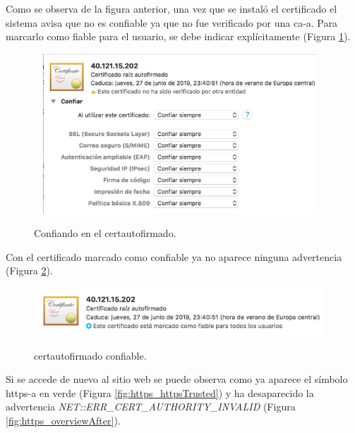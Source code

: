 \documentclass[12pt,a4paper, twoside]{report}
\begin{document}
		Como se observa de la figura anterior, una vez que se instaló el certificado el sistema avisa que no es confiable ya que no fue verificado por una \gls{ca-a}. Para marcarlo como fiable para el usuario, se debe indicar explícitamente (Figura \ref{fig:https_certTrusting}).
				
		\begin{figure}[!ht]   
			\caption{Confiando en el \gls{certautofirmado}.} 
			\begin{center} 
				\includegraphics[width=11cm,height=6cm]{Images/installationManual/https/certTrusting.png} \\
				\label{fig:https_certTrusting} 
			\end{center}  
		\end{figure}
								
		Con el certificado marcado como confiable ya no aparece ninguna advertencia (Figura \ref{fig:https_certTrustworthy}). 
								
		\begin{figure}[!ht]   
			\caption{\Gls{certautofirmado} confiable.} 
			\begin{center} 
				\includegraphics[width=11cm,height=1.8cm]{Images/installationManual/https/certTrustworthy.png} \\
				\label{fig:https_certTrustworthy} 
			\end{center}  
		\end{figure}
				
		Si se accede de nuevo al sitio web se puede observa como ya aparece el símbolo \gls{https-a} en verde (Figura \ref{fig:https_httpsTrusted}) y ha desaparecido la advertencia \textit{NET::ERR\_CERT\_AUTHORITY\_INVALID} (Figura \ref{fig:https_overviewAfter}).
				
\end{document}
